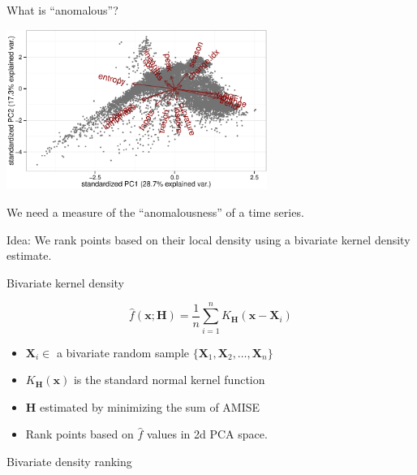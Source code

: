 \documentclass[14pt]{beamer}
\def\fullwidth#1{\vspace*{0.1cm}\par\centerline{\texttt{[image: \#1]}}}
\newcommand{\X}{\mathbf{X}}
\newcommand{\x}{\mathbf{x}}
\renewcommand{\H}{\mathbf{H}}
\begin{document}
\begin{frame}{What is ``anomalous''?}\fontsize{13}{15}\sf
\centerline{\includegraphics[width=8.5cm]{pca}}
We need a measure of the ``anomalousness'' of a time series.
\pause

Idea: We rank points based on their local density using a bivariate kernel density estimate.

\end{frame}


\begin{frame}{Bivariate kernel density}
\begin{block}{}
  \begin{equation*}
    \hat{f}(\x; \H) = \frac{1}{n}\sum_{i=1}^n K_{\H}(\x - \X_i)
  \end{equation*}
\end{block}\pause
\begin{itemize}
  \item $\X_i \in$ a bivariate random sample $\{\X_1, \X_2, \ldots, \X_n\}$
  \item $K_{\H}(\x)$ is the standard normal kernel function
  \item $\H$ estimated by minimizing the sum of AMISE
  \item Rank points based on $\hat{f}$ values in 2d PCA space.
\end{itemize}
\end{frame}


\begin{frame}{Bivariate density ranking}
\only<1>{\fullwidth{yahoohdr}}
\only<2>{\fullwidth{hdrout}}
\end{frame}



\end{document}

